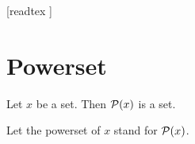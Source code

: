 \documentclass[10pt]{article}
\begin{document}
  \begin{imports}
    \begin{forthel}
      [readtex ]
    \end{forthel}
  \end{imports}


  \section{Powerset}

  \begin{forthel}
    \begin{axiom}[title=Powerset Axiom,id=FOUNDATIONS_10_5862230203564032,printid]
      Let $x$ be a set.
      Then $\mathcal{P}(x)$ is a set.
    \end{axiom}

    Let the powerset of $x$ stand for $\mathcal{P}(x)$.
  \end{forthel}
\end{document}
